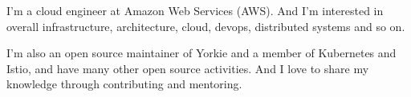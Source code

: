

\begin{cvparagraph}

I'm a cloud engineer at Amazon Web Services (AWS). And I'm interested in overall infrastructure, architecture, cloud, devops, distributed systems and so on.

I'm also an open source maintainer of Yorkie and a member of Kubernetes and Istio, and have many other open source activities. And I love to share my knowledge through contributing and mentoring.
\end{cvparagraph}
